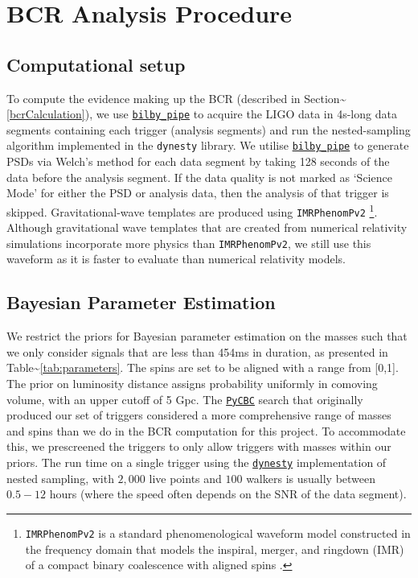 \documentclass[%
 reprint,
 amsmath,amssymb,
 aps,
]{revtex4}
\begin{document}
\hypertarget{bcr-analysis-procedure}{%
\section{BCR Analysis Procedure}\label{bcr-analysis-procedure}}

\hypertarget{computational-setup}{%
\subsection{Computational setup}\label{computational-setup}}

To compute the evidence making up the BCR (described in Section\textasciitilde\ref{bcrCalculation}), we use \href{https://lscsoft.docs.ligo.org/bilby_pipe/}{\texttt{bilby\_pipe}} to acquire
the LIGO data in 4s-long data segments containing each trigger (analysis segments) and run the nested-sampling algorithm
implemented in the \texttt{dynesty} library. We utilise \href{https://lscsoft.docs.ligo.org/bilby_pipe/}{\texttt{bilby\_pipe}} to generate PSDs via Welch's method for each data
segment by taking 128 seconds of the data before the analysis segment. If the data quality is not marked as `Science
Mode' for either the PSD or analysis data, then the analysis of that trigger is skipped. Gravitational-wave templates
are produced using \texttt{IMRPhenomPv2} \footnote{\texttt{IMRPhenomPv2} is a standard phenomenological waveform model constructed in the
  frequency domain that models the inspiral, merger, and ringdown (IMR) of a compact binary coalescence with aligned spins
  \citep{khan2016frequency}.}. Although gravitational wave templates that are created from numerical relativity simulations
incorporate more physics than \texttt{IMRPhenomPv2}, we still use this waveform as it is faster to evaluate than numerical
relativity models.

\hypertarget{bayesian-parameter-estimation}{%
\subsection{Bayesian Parameter Estimation}\label{bayesian-parameter-estimation}}

We restrict the priors for Bayesian parameter estimation on the masses such that we only consider signals that are less
than 454ms in duration, as presented in Table\textasciitilde\ref{tab:parameters}. The spins are set to be aligned with a range from
{[}0,1{]}. The prior on luminosity distance assigns probability uniformly in comoving volume, with an upper cutoff of 5 Gpc.
The \href{https://pycbc.org/}{\texttt{PyCBC}} search that originally produced our set of triggers considered a more comprehensive range of masses and
spins than we do in the BCR computation for this project. To accommodate this, we prescreened the triggers to only allow
triggers with masses within our priors. The run time on a single trigger using the \href{https://arxiv.org/abs/1904.02180}{\texttt{dynesty}} implementation of nested
sampling, with \(2,000\) live points and \(100\) walkers is usually between \(0.5-12\) hours (where the speed often depends on
the SNR of the data segment).
\end{document}
